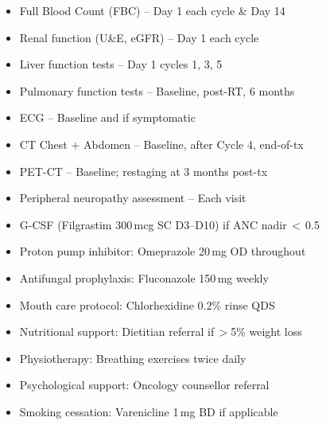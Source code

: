 \documentclass[11pt,a4paper]{scrartcl}
\begin{document}
\noindent
\begin{minipage}[t]{0.475\linewidth}
  \begin{tcolorbox}[protocolbox, title={\faFlask\quad Baseline \& On-treatment Investigations}, breakable=false]
    \footnotesize
    \begin{itemize}[leftmargin=1.2em, itemsep=2pt, label=\textcolor{TealAccent}{\faCheckCircle}]
      \item Full Blood Count (FBC) -- Day 1 each cycle \& Day 14
      \item Renal function (U\&E, eGFR) -- Day 1 each cycle
      \item Liver function tests -- Day 1 cycles 1, 3, 5
      \item Pulmonary function tests -- Baseline, post-RT, 6 months
      \item ECG -- Baseline and if symptomatic
      \item CT Chest + Abdomen -- Baseline, after Cycle 4, end-of-tx
      \item PET-CT -- Baseline; restaging at 3 months post-tx
      \item Peripheral neuropathy assessment -- Each visit
    \end{itemize}
  \end{tcolorbox}
\end{minipage}%
\hfill
\begin{minipage}[t]{0.495\linewidth}
  \begin{tcolorbox}[successbox, title={\faLock\quad Supportive Care Plan}, breakable=false]
    \footnotesize
    \begin{itemize}[leftmargin=1.2em, itemsep=2pt, label=\textcolor{SuccessGreen}{\faCheckCircle}]
      \item G-CSF (Filgrastim 300\,mcg SC D3--D10) if ANC nadir\,$<$\,0.5
      \item Proton pump inhibitor: Omeprazole 20\,mg OD throughout
      \item Antifungal prophylaxis: Fluconazole 150\,mg weekly
      \item Mouth care protocol: Chlorhexidine 0.2\% rinse QDS
      \item Nutritional support: Dietitian referral if\,$>$5\% weight loss
      \item Physiotherapy: Breathing exercises twice daily
      \item Psychological support: Oncology counsellor referral
      \item Smoking cessation: Varenicline 1\,mg BD if applicable
    \end{itemize}
  \end{tcolorbox}
\end{minipage}
\end{document}
